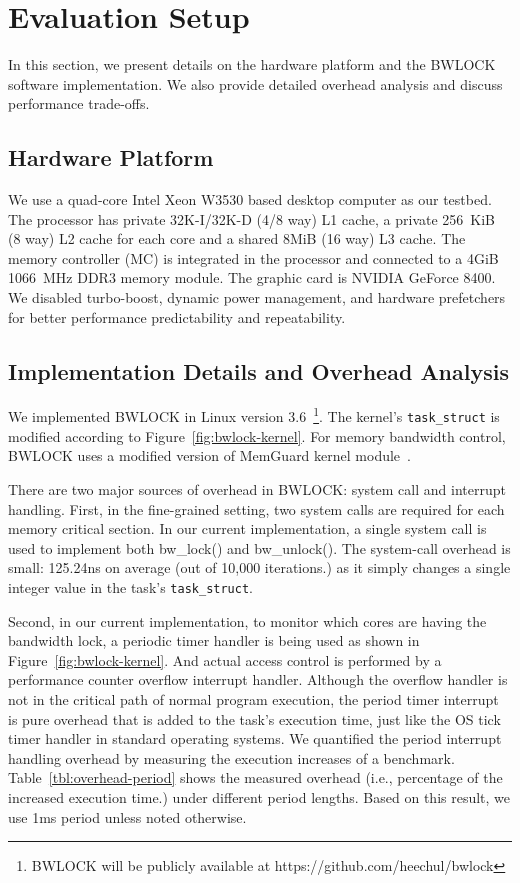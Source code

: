 \documentclass[times, 10pt,onecolumn]{article}
\begin{document}
\section{Evaluation Setup} \label{sec:setup}

In this section, we present details on the hardware platform and
the BWLOCK software implementation. We also provide detailed
overhead analysis and discuss performance trade-offs.

\subsection{Hardware Platform}

We use a quad-core Intel Xeon W3530 based desktop computer as our
testbed. The processor has private 32K-I/32K-D (4/8 way) L1 cache, a
private 256~KiB (8 way) L2 cache for each core and a shared 8MiB (16
way) L3 cache. The memory controller (MC) is integrated in the
processor and connected to a 4GiB 1066~MHz DDR3 memory module. The
graphic card is NVIDIA GeForce 8400.
We disabled turbo-boost, dynamic power management, and hardware
prefetchers for better performance predictability and repeatability.

\subsection{Implementation Details and Overhead Analysis} \label{sec:overhead}

We implemented BWLOCK in Linux version 3.6~\footnote{BWLOCK will be
publicly available at https://github.com/heechul/bwlock}. The kernel's
\texttt{task\_struct} is modified according to
Figure~\ref{fig:bwlock-kernel}. For memory bandwidth control, BWLOCK
uses a modified version of MemGuard kernel module~\cite{yun2013rtas}.

There are two major sources of overhead in BWLOCK: system call and
interrupt handling. First, in the fine-grained setting, two system
calls are required for each memory critical section. In our current
implementation, a single system call is used to
implement both bw\_lock() and bw\_unlock(). The system-call overhead
is small: 125.24ns on average (out of 10,000 iterations.) as it simply
changes a single integer value in the task's \texttt{task\_struct}.

Second, in our current implementation, to monitor which cores
are having the bandwidth lock, a periodic timer handler is being
used as shown in Figure~\ref{fig:bwlock-kernel}. And actual access
control is performed by a performance counter overflow interrupt
handler. Although the overflow handler is not in the critical path of
normal program execution, the period timer interrupt is pure overhead
that is added to the task's execution time, just like the OS tick
timer handler in standard operating systems. We quantified
the period interrupt handling overhead by measuring the execution
increases of a benchmark. Table~\ref{tbl:overhead-period} shows the
measured overhead (i.e., percentage of the increased execution time.)
under different period lengths. Based on this result, we use 1ms
period unless noted otherwise.
\end{document}
